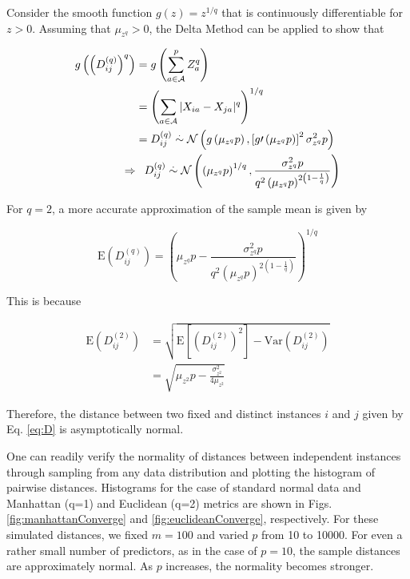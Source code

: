 \documentclass[10pt,letterpaper]{article}\usepackage[]{graphicx}\usepackage[]{color}
\begin{document}
Consider the smooth function $g(z) = z^{1/q}$ that is continuously differentiable for $z>0$. Assuming that $\mu_{z^q}>0$, the Delta Method \cite{allStats} can be applied to show that 

\begin{equation}\label{eq:DqDeltaMethod}
\begin{aligned}
g\left(\left(D^{(q)}_{ij}\right)^q\right) &= g\left(\displaystyle \sum_{a \in \mathcal{A}}^{p}Z^q_a\right) \\
&= \left(\sum_{a \in \mathcal{A}} |X_{ia} - X_{ja}|^q\right)^{1/q} \\
&= D^{(q)}_{ij} \overset{.}{\sim} \mathcal{N}\left(g\left(\mu_{z^q}p\right),\left[g\prime \left(\mu_{z^q}p\right)\right]^2\sigma^2_{z^q}p\right) \\
\Rightarrow &\hphantom{=} D^{(q)}_{ij} \overset{.}{\sim} \mathcal{N}\left(\left(\mu_{z^q}p\right)^{1/q},\frac{\sigma^2_{z^q}p}{q^2\left(\mu_{z^q}p\right)^{2\left(1 - \frac{1}{q}\right)}}\right)
\end{aligned}
\end{equation}

For $q = 2$, a more accurate approximation of the sample mean is given by

\begin{equation}\label{eq:DqMeanImproved}
\text{E}\left(D^{(q)}_{ij}\right) = \left(\mu_{z^q}p - \frac{\sigma^2_{z^q}p}{q^2\left(\mu_{z^q}p\right)^{2\left(1 - \frac{1}{q}\right)}}\right)^{1/q}
\end{equation}

This is because

\begin{equation}\label{eq:DqImprovedExplaned}
\begin{aligned}
\text{E}\left(D^{(2)}_{ij}\right) &= \sqrt{\text{E}\left[\left(D^{(2)}_{ij}\right)^2\right] - \text{Var}\left(D^{(2)}_{ij}\right)} \\
&= \sqrt{\mu_{z^2}p - \frac{\sigma^2_{z^2}}{4\mu_{z^2}}}
\end{aligned}
\end{equation}

Therefore, the distance between two fixed and distinct instances $i$ and $j$ given by Eq. \ref{eq:D} is asymptotically normal.

One can readily verify the normality of distances between independent instances through sampling from any data distribution and plotting the histogram of pairwise distances. Histograms for the case of standard normal data and Manhattan (q=1) and Euclidean (q=2) metrics are shown in Figs. \ref{fig:manhattanConverge} and \ref{fig:euclideanConverge}, respectively. For these simulated distances, we fixed $m=100$ and varied $p$ from 10 to 10000. For even a rather small number of predictors, as in the case of $p=10$, the sample distances are approximately normal. As $p$ increases, the normality becomes stronger.
\end{document}
